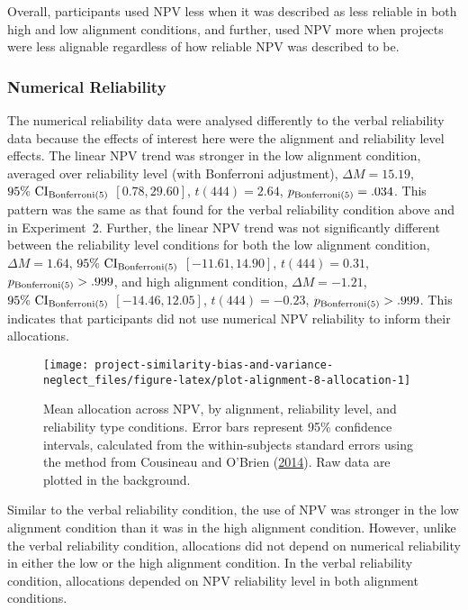 \documentclass[
  english,
  man, donotrepeattitle,floatsintext]{apa7}
\theoremstyle{definition}
\theoremstyle{definition}
\theoremstyle{definition}
\theoremstyle{definition}
\theoremstyle{remark}
\begin{document}
Overall, participants used NPV less when it was described as less reliable in
both high and low alignment conditions, and further, used NPV more when projects
were less alignable regardless of how reliable NPV was described to be.

\hypertarget{numerical-reliability}{%
\subsubsection{Numerical Reliability}\label{numerical-reliability}}

The numerical reliability data were analysed differently to the verbal
reliability data because the effects of interest here were the alignment and
reliability level effects. The linear NPV trend was stronger in the low
alignment condition, averaged over reliability level (with Bonferroni
adjustment),
\(\Delta M = 15.19\), \(95\%\ \mathrm{CI}_\mathrm{\scriptsize Bonferroni(5)}\) \([0.78, 29.60]\), \(t(444) = 2.64\), \(p_\mathrm{\scriptsize Bonferroni(5)} = .034\). This
pattern was the same as that found for the verbal reliability condition above
and in Experiment~2. Further, the linear NPV trend was not significantly
different between the reliability level conditions for both the low alignment
condition,
\(\Delta M = 1.64\), \(95\%\ \mathrm{CI}_\mathrm{\scriptsize Bonferroni(5)}\) \([-11.61, 14.90]\), \(t(444) = 0.31\), \(p_\mathrm{\scriptsize Bonferroni(5)} > .999\),
and high alignment condition,
\(\Delta M = -1.21\), \(95\%\ \mathrm{CI}_\mathrm{\scriptsize Bonferroni(5)}\) \([-14.46, 12.05]\), \(t(444) = -0.23\), \(p_\mathrm{\scriptsize Bonferroni(5)} > .999\).
This indicates that participants did not use numerical NPV reliability to inform
their allocations.



\begin{figure}[!htbp]
\texttt{[image: project-similarity-bias-and-variance-neglect\_files/figure-latex/plot-alignment-8-allocation-1]} \caption{Mean allocation across NPV, by alignment, reliability level, and reliability type conditions. Error bars represent 95\% confidence intervals, calculated from the within-subjects standard errors using the method from Cousineau and O'Brien (\protect\hyperlink{ref-cousineau2014}{2014}). Raw data are plotted in the background.}\label{fig:plot-alignment-8-allocation}
\end{figure}

Similar to the verbal reliability condition, the use of NPV was stronger in the
low alignment condition than it was in the high alignment condition. However,
unlike the verbal reliability condition, allocations did not depend on numerical
reliability in either the low or the high alignment condition. In the verbal
reliability condition, allocations depended on NPV reliability level in both
alignment conditions.
\end{document}
